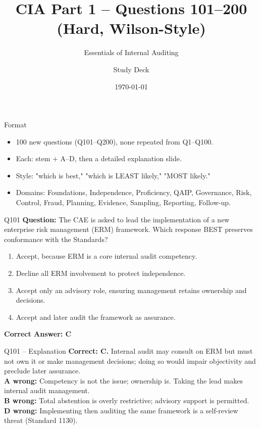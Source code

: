 \documentclass[aspectratio=169,10pt]{beamer}
\title{CIA Part 1 -- Questions 101--200 (Hard, Wilson-Style)}
\subtitle{Essentials of Internal Auditing}
\author{Study Deck}
\date{\today}
\begin{document}
	
	\begin{frame}
		\titlepage
	\end{frame}
	
	\begin{frame}{Format}
		\begin{itemize}
			\item 100 new questions (Q101--Q200), none repeated from Q1--Q100.
			\item Each: stem + A--D, then a detailed explanation slide.
			\item Style: "which is best," "which is LEAST likely," "MOST likely."
			\item Domains: Foundations, Independence, Proficiency, QAIP, Governance, Risk, Control, Fraud, Planning, Evidence, Sampling, Reporting, Follow-up.
		\end{itemize}
	\end{frame}
	
	\begin{frame}[t]{Q101}
		\small
		\textbf{Question:} The CAE is asked to lead the implementation of a new enterprise risk management (ERM) framework. Which response BEST preserves conformance with the Standards?
		\begin{enumerate}[label=\Alph*.,itemsep=1pt,topsep=2pt]
			\item Accept, because ERM is a core internal audit competency.
			\item Decline all ERM involvement to protect independence.
			\item Accept only an advisory role, ensuring management retains ownership and decisions.
			\item Accept and later audit the framework as assurance.
		\end{enumerate}
		\vspace{4pt}
		\textbf{Correct Answer: C}
	\end{frame}
	
	\begin{frame}[t]{Q101 -- Explanation}
		\small
		\textbf{Correct: C.} Internal audit may consult on ERM but must not own it or make management decisions; doing so would impair objectivity and preclude later assurance. \\[4pt]
		\textbf{A wrong:} Competency is not the issue; ownership is. Taking the lead makes internal audit management. \\[2pt]
		\textbf{B wrong:} Total abstention is overly restrictive; advisory support is permitted. \\[2pt]
		\textbf{D wrong:} Implementing then auditing the same framework is a self-review threat (Standard 1130).
	\end{frame}
	
\end{document}
